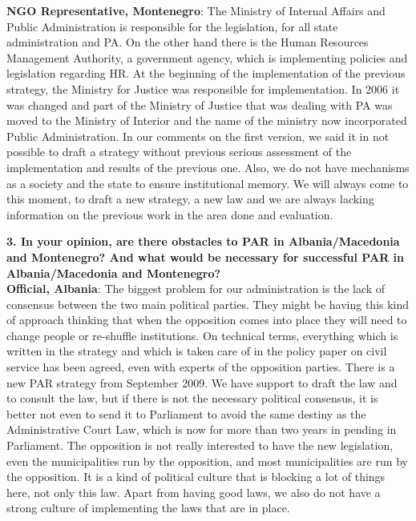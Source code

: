 \textbf{NGO Representative, Montenegro}: The Ministry of Internal Affairs and Public Administration is responsible for the legislation,  for all state administration and PA. On the other hand there is the Human Resources Management Authority, a government agency, which is implementing policies and legislation regarding HR. At the beginning of the implementation of the previous strategy, the Ministry for Justice was responsible for implementation. In 2006 it was changed and part of the Ministry of Justice that was dealing with PA was moved to the Ministry of Interior and the name of the ministry now incorporated Public Administration. In our comments on the first version, we said it in not possible to draft a strategy without previous serious assessment of the implementation and results of the previous one. Also, we do not have mechanisms as a society and the state to ensure institutional memory. We will always come to this moment, to draft a new strategy, a new law and we are always lacking information on the previous work in the area done and evaluation.\newpage
\textbf{3. In your opinion, are there obstacles to PAR in Albania/Macedonia and Montenegro? And what would be necessary for successful PAR in Albania/Macedonia and Montenegro? }\\
\textbf{Official, Albania}: The biggest problem for our administration is the lack of consensus between the two main political parties. They might be having this kind of approach thinking that when the opposition comes into place they will need to change people or re-shuffle institutions. On technical terms, everything which is written in the strategy and which is taken care of in the policy paper on civil service has been agreed, even with experts of the opposition parties. There is a new PAR strategy from September 2009. We have support to draft the law and to consult the law, but if there is not the necessary political consensus, it is better not even to send it to Parliament to avoid the same destiny as the Administrative Court Law, which is now for more than two years in pending in Parliament. The opposition is not really interested to have the new legislation, even the municipalities run by the opposition, and most municipalities are run by the opposition. It is a kind of political culture that is blocking a lot of things here, not only this law. Apart from having good laws, we also do not have a strong culture of implementing the laws that are in place.
